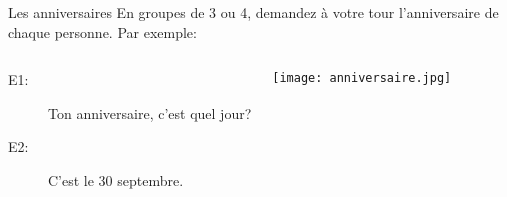\begin{frame}{Les anniversaires}
  En groupes de 3 ou 4, demandez à votre tour l'anniversaire de chaque personne.
  Par exemple: \\
  \begin{columns}
      \begin{description}
        \item[E1:] Ton anniversaire, c'est quel jour?
        \item[] 
        \item[E2:] C'est le 30 septembre.
        \item[] 
      \end{description}
      \begin{center}
        \texttt{[image: anniversaire.jpg]}
      \end{center}
  \end{columns}
\end{frame}
